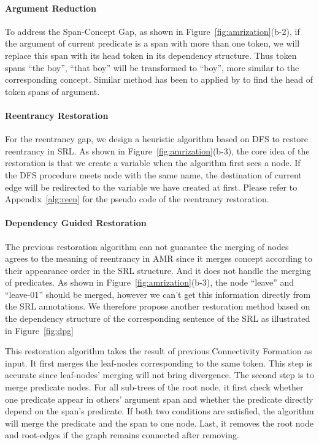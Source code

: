 \documentclass[11pt]{article}
\begin{document}
\paragraph{Argument Reduction}
To address the Span-Concept Gap, 
as shown in Figure~\ref{fig:amrization}(b-2), if the argument of current predicate is a span with more than one token, we will replace this span with its head token in its dependency structure. Thus token spans ``the boy'', ``that boy'' will be transformed to ``boy'', more similar to the corresponding concept. Similar method has been to applied by \cite{zhang-etal-2021-comparing} to find the head of token spans of argument.


\paragraph{Reentrancy Restoration} 
For the reentrancy gap, we design a heuristic algorithm based on DFS to restore reentrancy in SRL. 
As shown in Figure~\ref{fig:amrization}(b-3), the core idea of the restoration is that we create a variable when the algorithm first sees a node. If the DFS procedure meets node with the same name, the destination of current edge will be redirected to the variable we have created at first. Please refer to Appendix~\ref{alg:reen} for the pseudo code of the reentrancy restoration. 

\paragraph{Dependency Guided Restoration}
The previous restoration algorithm can not guarantee the merging of nodes agrees to the meaning of reentrancy in AMR since it merges concept according to their appearance order in the SRL structure. And it does not handle the merging of predicates. As shown in Figure~\ref{fig:amrization}(b-3), the node ``leave'' and ``leave-01'' should be merged, however we can't get this information directly from the SRL annotations. We therefore propose another restoration method based on the dependency structure of the corresponding sentence of the SRL as illustrated in Figure~\ref{fig:dpg}

This restoration algorithm takes the result of previous Connectivity Formation as input. It first merges the leaf-nodes corresponding to the same token. This step is accurate since leaf-nodes' merging will not bring divergence. The second step is to merge predicate nodes. For all sub-trees of the root node, it first check whether one predicate appear in others' argument span and whether the predicate directly depend on the span's predicate. If both two conditions are satisfied, the algorithm will merge the predicate and the span to one node. Last, it removes the root node and root-edges if the graph remains connected after removing. 
\end{document}
